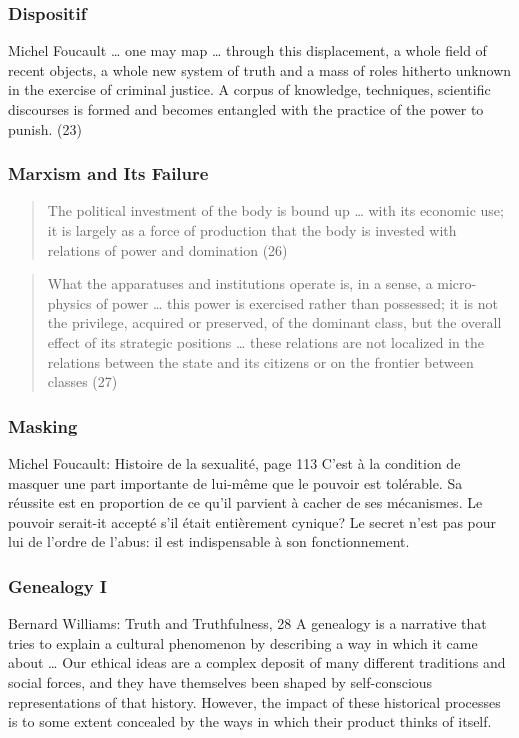 \documentclass[xcolor=dvipsnames]{beamer}
\begin{document}
\begin{frame}
  \frametitle{Dispositif}
  \begin{block}{Michel Foucault}
    {\ldots} one may map {\ldots} through this displacement, a whole
    field of recent objects, a whole new system of truth and a mass of
    roles hitherto unknown in the exercise of criminal justice. A
    corpus of knowledge, techniques, scientific discourses is formed
    and becomes entangled with the practice of the power to punish.
    (23)
  \end{block}
\end{frame}

\begin{frame}
  \frametitle{Marxism and Its Failure}
  \begin{quote}
    The political investment of the body is bound up {\ldots} with its
    economic use; it is largely as a force of production that the body
    is invested with relations of power and domination (26)
  \end{quote}
  \begin{quote}
    What the apparatuses and institutions operate is, in a sense, a
    micro-physics of power {\ldots} this power is exercised rather
    than possessed; it is not the privilege, acquired or preserved, of
    the dominant class, but the overall effect of its strategic
    positions {\ldots} these relations are not localized in the
    relations between the state and its citizens or on the frontier
    between classes (27)
  \end{quote}
\end{frame}

\begin{frame}
  \frametitle{Masking}
  \begin{block}{Michel Foucault: Histoire de la sexualit{\'e},
      page 113}
    C'est {\`a} la condition de masquer une part importante de
    lui-m{\^e}me que le pouvoir est tol{\'e}rable. Sa r{\'e}ussite
    est en proportion de ce qu'il parvient {\`a} cacher de ses
    m{\'e}canismes. Le pouvoir serait-it accept{\'e} s'il
    {\'e}tait enti{\`e}rement cynique? Le secret n'est pas pour
    lui de l'ordre de l'abus: il est indispensable {\`a} son
    fonctionnement.
  \end{block}
\end{frame}

\begin{frame}
  \frametitle{Genealogy I}
  \begin{block}{Bernard Williams: Truth and Truthfulness, 28}
  A genealogy is a narrative that tries to explain a cultural
  phenomenon by describing a way in which it came about {\ldots} Our
  ethical ideas are a complex deposit of many different traditions and
  social forces, and they have themselves been shaped by
  self-conscious representations of that history. However, the impact
  of these historical processes is to some extent concealed by the
  ways in which their product thinks of itself.
  \end{block}
\end{frame}
\end{document}
